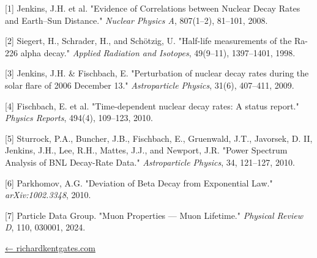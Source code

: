 \documentclass[
  10pt,
]{article}
\begin{document}
{[}1{]} Jenkins, J.H. et al. "Evidence of Correlations between Nuclear
Decay Rates and Earth--Sun Distance." \emph{Nuclear Physics A},
807(1--2), 81--101, 2008.

{[}2{]} Siegert, H., Schrader, H., and Schötzig, U. "Half-life
measurements of the Ra-226 alpha decay." \emph{Applied Radiation and
Isotopes}, 49(9--11), 1397--1401, 1998.

{[}3{]} Jenkins, J.H. \& Fischbach, E. "Perturbation of nuclear decay
rates during the solar flare of 2006 December 13." \emph{Astroparticle
Physics}, 31(6), 407--411, 2009.

{[}4{]} Fischbach, E. et al. "Time-dependent nuclear decay rates: A
status report." \emph{Physics Reports}, 494(4), 109--123, 2010.

{[}5{]} Sturrock, P.A., Buncher, J.B., Fischbach, E., Gruenwald, J.T.,
Javorsek, D. II, Jenkins, J.H., Lee, R.H., Mattes, J.J., and Newport,
J.R. "Power Spectrum Analysis of BNL Decay-Rate Data."
\emph{Astroparticle Physics}, 34, 121--127, 2010.

{[}6{]} Parkhomov, A.G. "Deviation of Beta Decay from Exponential Law."
\emph{arXiv:1002.3348}, 2010.

{[}7{]} Particle Data Group. "Muon Properties --- Muon Lifetime."
\emph{Physical Review D}, 110, 030001, 2024.

\href{https://richardkentgates.com/}{← richardkentgates.com}
\end{document}
